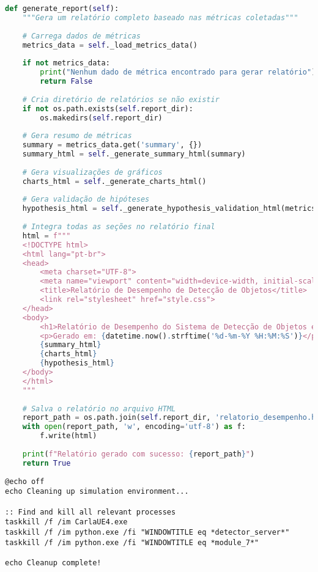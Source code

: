 \documentclass[
	12pt,				%
	oneside, %
	a4paper,			%
	english,			%
	french,				%
	spanish,			%
	brazil				%
	]{abntex2}
\begin{document}
\begin{apendicesenv}
\begin{lstlisting}[language=Python, caption=Método de geração de relatório de resultados., label=lst:generate_report]
def generate_report(self):
    """Gera um relatório completo baseado nas métricas coletadas"""
    
    # Carrega dados de métricas
    metrics_data = self._load_metrics_data()
    
    if not metrics_data:
        print("Nenhum dado de métrica encontrado para gerar relatório")
        return False
        
    # Cria diretório de relatórios se não existir
    if not os.path.exists(self.report_dir):
        os.makedirs(self.report_dir)
        
    # Gera resumo de métricas
    summary = metrics_data.get('summary', {})
    summary_html = self._generate_summary_html(summary)
    
    # Gera visualizações de gráficos
    charts_html = self._generate_charts_html()
    
    # Gera validação de hipóteses
    hypothesis_html = self._generate_hypothesis_validation_html(metrics_data)
    
    # Integra todas as seções no relatório final
    html = f"""
    <!DOCTYPE html>
    <html lang="pt-br">
    <head>
        <meta charset="UTF-8">
        <meta name="viewport" content="width=device-width, initial-scale=1.0">
        <title>Relatório de Desempenho de Detecção de Objetos</title>
        <link rel="stylesheet" href="style.css">
    </head>
    <body>
        <h1>Relatório de Desempenho do Sistema de Detecção de Objetos e Avisos</h1>
        <p>Gerado em: {datetime.now().strftime('%d-%m-%Y %H:%M:%S')}</p>
        {summary_html}
        {charts_html}
        {hypothesis_html}
    </body>
    </html>
    """
    
    # Salva o relatório no arquivo HTML
    report_path = os.path.join(self.report_dir, 'relatorio_desempenho.html')
    with open(report_path, 'w', encoding='utf-8') as f:
        f.write(html)
    
    print(f"Relatório gerado com sucesso: {report_path}")
    return True
\end{lstlisting}

\begin{lstlisting}[style=cmdstyle, caption={Script de encerramento controlado do sistema.}, label={lst:stop_all}]
@echo off
echo Cleaning up simulation environment...

:: Find and kill all relevant processes
taskkill /f /im CarlaUE4.exe
taskkill /f /im python.exe /fi "WINDOWTITLE eq *detector_server*"
taskkill /f /im python.exe /fi "WINDOWTITLE eq *module_7*"

echo Cleanup complete!
\end{lstlisting}

\end{apendicesenv}
\end{document}
